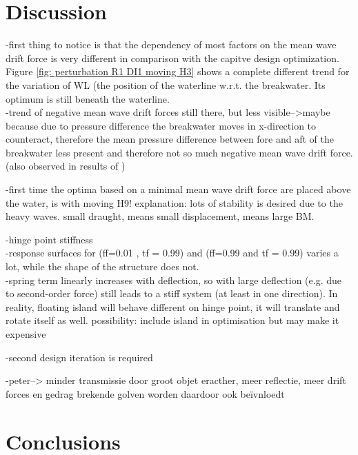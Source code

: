 \section{Discussion}
\label{sec: discussion moving}


-first thing to notice is that the dependency of most factors on the mean wave drift force is very different in comparison with the capitve design optimization. Figure \ref{fig: perturbation R1 DI1 moving H3} shows a complete different trend for the variation of WL (the position of the waterline w.r.t. the breakwater. Its optimum is still beneath the waterline. \\

-trend of negative mean wave drift forces still there, but less visible-->maybe because due to pressure difference the breakwater moves in x-direction to counteract, therefore the mean pressure difference between fore and aft of the breakwater less present and therefore not so much negative mean wave drift force. (also observed in results of \citet{Zanden2021})



-first time the optima based on a minimal mean wave drift force are placed above the water, is with moving H9! explanation: lots of stability is desired due to the heavy waves. small draught, means small displacement, means large BM.


-hinge point stiffness\\
-response surfaces for (ff=0.01 , tf = 0.99) and (ff=0.99 and tf = 0.99) varies a lot, while the shape of the structure does not.\\
-spring term linearly increases with deflection, so with large deflection (e.g. due to second-order force) still leads to a stiff system (at least in one direction). In reality, floating island will behave different on hinge point, it will translate and rotate itself as well. possibility: include island in optimisation but may make it expensive


-second design iteration is required

-peter--> minder transmissie door groot objet eracther, meer reflectie, meer drift forces en gedrag brekende golven worden daardoor ook beïvnloedt

\section{Conclusions}
\label{sec: conclusions moving}